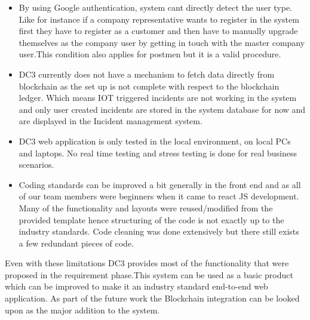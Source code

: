 \begin{itemize}
\item By using Google authentication, system cant directly detect the user type. Like for instance if a company representative wants to register in the system first they have to register as a customer and then have to manually upgrade themselves as the company user by getting in touch with the master company user.This condition also applies for postmen but it is a valid procedure.
\end{itemize}
\begin{itemize}
\item DC3 currently does not have a mechanism to fetch data directly from blockchain as the set up is not complete with respect to the blockchain ledger. Which means IOT triggered incidents are not working in the system and only user created incidents are stored in the system database for now and are displayed in the Incident management system.
\item DC3 web application is only tested in the local environment, on local PCs and laptops. No real time testing and stress testing is done for real business scenarios.
\end{itemize}
\begin{itemize}
\item Coding standards can be improved a bit generally in the front end and as all of our team members were beginners when it came to react JS development. Many of the functionality and layouts were reused/modified from the provided template hence structuring of the code is not exactly up to the industry standards. Code cleaning was done extensively but there still exists a few redundant pieces of code. 
\end{itemize}
Even with these limitations DC3 provides most of the functionality that were proposed in the requirement phase.This system can be used as a  basic product which can be improved to make it an industry standard end-to-end web application. As part of the future work the Blockchain integration can be looked upon as the major addition to the system.
